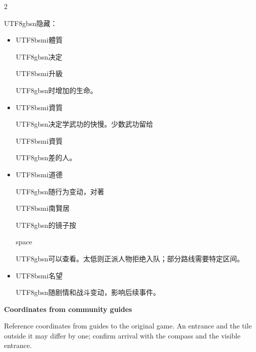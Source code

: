 \begin{paracol}{2}
\begin{CJK}{UTF8}{gbsn}隐藏：\end{CJK}\par
\begin{itemize}[leftmargin=*,topsep=1pt,itemsep=0pt,parsep=0pt]\item \begin{CJK}{UTF8}{bsmi}體質\end{CJK}\begin{CJK}{UTF8}{gbsn}决定\end{CJK}\begin{CJK}{UTF8}{bsmi}升級\end{CJK}\begin{CJK}{UTF8}{gbsn}时增加的生命。\end{CJK}\item \begin{CJK}{UTF8}{bsmi}資質\end{CJK}\begin{CJK}{UTF8}{gbsn}决定学武功的快慢。少数武功留给\end{CJK}\begin{CJK}{UTF8}{bsmi}資質\end{CJK}\begin{CJK}{UTF8}{gbsn}差的人。\end{CJK}\item \begin{CJK}{UTF8}{bsmi}道德\end{CJK}\begin{CJK}{UTF8}{gbsn}随行为变动，对著\end{CJK}\begin{CJK}{UTF8}{bsmi}南賢居\end{CJK}\begin{CJK}{UTF8}{gbsn}的镜子按\end{CJK} space \begin{CJK}{UTF8}{gbsn}可以查看。太低则正派人物拒绝入队；部分路线需要特定区间。\end{CJK}\item \begin{CJK}{UTF8}{bsmi}名望\end{CJK}\begin{CJK}{UTF8}{gbsn}随剧情和战斗变动，影响后续事件。\end{CJK}\end{itemize}
\switchcolumn*
\footnotesize\setlength{\parskip}{2pt}
{\footnotesize\bfseries Coordinates from community guides\par}
Reference coordinates from guides to the original game. An entrance and the tile outside it may differ by one; confirm arrival with the compass and the visible entrance.\par

\end{paracol}
